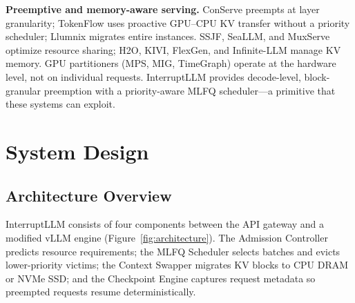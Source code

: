 \documentclass[conference]{IEEEtran}
\begin{document}
\textbf{Preemptive and memory-aware serving.} ConServe\cite{qiao2024conserve} preempts at layer granularity; TokenFlow\cite{chen2025tokenflow} uses proactive GPU--CPU KV transfer without a priority scheduler; Llumnix\cite{sun2024llumnix} migrates entire instances. SSJF\cite{qiu2024ssjf}, SeaLLM\cite{zhao2025seallm}, and MuxServe\cite{duan2024muxserve} optimize resource sharing; H2O\cite{zhang2023h2o}, KIVI\cite{liu2024kivi}, FlexGen\cite{sheng2023flexgen}, and Infinite-LLM\cite{lin2024infinite} manage KV memory. GPU partitioners (MPS, MIG, TimeGraph\cite{kato2011timegraph}) operate at the hardware level, not on individual requests. InterruptLLM provides decode-level, block-granular preemption with a priority-aware MLFQ scheduler---a primitive that these systems can exploit.

\section{System Design}\label{sec:design}

\subsection{Architecture Overview}

InterruptLLM consists of four components between the API gateway and a modified vLLM engine (Figure~\ref{fig:architecture}). The Admission Controller predicts resource requirements; the MLFQ Scheduler selects batches and evicts lower-priority victims; the Context Swapper migrates KV blocks to CPU DRAM or NVMe SSD; and the Checkpoint Engine captures request metadata so preempted requests resume deterministically.
\end{document}
